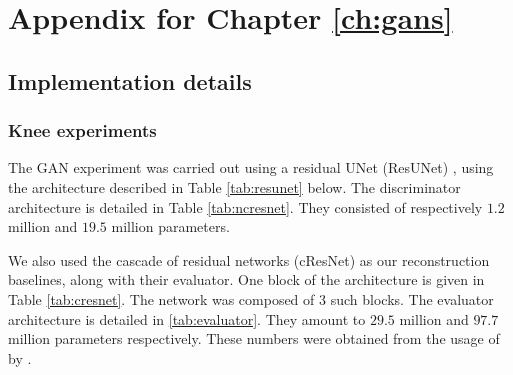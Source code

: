 \chapter{Appendix for Chapter \ref{ch:gans}}

\section{Implementation details}\label{app:gan_implementation}

\subsection{Knee experiments}
The GAN experiment was carried out using a residual UNet (ResUNet) \citet{belghazi2019learning}, using the architecture described in  Table \ref{tab:resunet} below. The discriminator architecture is detailed in Table \ref{tab:ncresnet}. They consisted of respectively $1.2$ million and $19.5$ million parameters. 

We also used the cascade of residual networks (cResNet) \citet{zhang2019reducing} as our reconstruction baselines, along with their evaluator. One block of the architecture is given in Table \ref{tab:cresnet}. The network was composed of $3$ such blocks. The evaluator architecture is detailed in \ref{tab:evaluator}. They amount to $29.5$ million and $97.7$ million parameters respectively. These numbers were obtained from the usage of \citet{zhang2019reducing} by \citet{pineda2020active}.



\begin{table}[!ht]
    \centering

    \caption{Discriminator ResNet. This was inspired by the discriminator of \cite{belghazi2019learning}. The model used ReLU activations, and consisted of $19.5$ million parameters.}
    \label{tab:ncresnet}
\end{table}

